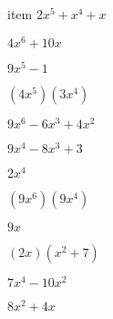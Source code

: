\documentclass{article}
\begin{document}
\begin{multicols}{2}
item $2x^{5}+x^{4}+x$\item $4x^{6}+10x$\item $9x^{5}-1$\item $(4x^{5})(3x^{4})$\item $9x^{6}-6x^{3}+4x^2$\item $9x^{4}-8x^{3}+3$\item $2x^{4}$\item $(9x^{6})(9x^{4})$\item $9x$\item $(2x)(x^2+7)$\item $7x^{4}-10x^2$\item $8x^2+4x$\item
\end{multicols}
\end{document}
